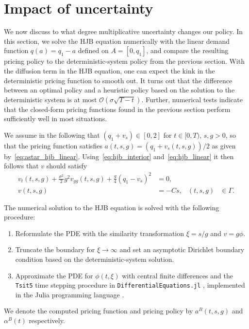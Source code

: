 \documentclass[main.tex]{subfiles}
\begin{document}
\section{Impact of uncertainty}\label{sec:stochastic_hjb}
We now discuss to what degree multiplicative uncertainty changes
our policy. In this section, we solve the HJB equation numerically with the linear
demand function $q(a)=q_1-a$ defined on $A=[0,q_1]$, and compare the
resulting pricing policy to the
deterministic-system policy from the previous section.
With the diffusion term in the HJB equation, one can
expect the kink in the deterministic pricing function to smooth
out. It turns out that the difference between an optimal
policy and a heuristic policy based on the solution
to the deterministic system is at most
$\mathcal{O}(\sigma \sqrt{T-t})$. Further, numerical tests indicate that the
closed-form pricing functions found in the previous section
perform sufficiently well in most situations.

We assume in the following that $(q_1+v_s)\in[0,2]$ for
$t\in[0,T)$, $s,g>0$, so
that the pricing function satisfies $a(t,s,g) = (q_1+v_s(t,s,g))/2$ as
given by~\eqref{eq:astar_hjb_linear}.
Using~\eqref{eq:hjb_interior} and~\eqref{eq:hjb_linear} it then
follows that $v$ should satisfy
\begin{align}\label{eq:hjb_impact_uncertainty}
  v_t(t,s,g)+\frac{\sigma^2}{2} g^2v_{gg}(t,s,g)
  +\frac{g}{4}{(q_1-v_s)}^2
  &= 0, \\%
  v(t,s,g) &= -Cs,&(t,s,g)&\in \Gamma.
\end{align}

The numerical solution to the HJB equation is solved with the
following procedure:
\begin{enumerate}
\item Reformulate the PDE with the similarity
  transformation $\xi = s/g$ and $v = g\phi$.
\item Truncate the boundary
  for $\xi\to\infty$ and set an asymptotic Dirichlet boundary condition
  based on the deterministic-system solution.
\item Approximate
  the PDE for $\phi(t,\xi)$ with central finite differences and the
  \texttt{Tsit5} time stepping procedure in
  \texttt{DifferentialEquations.jl}
  \citep{rackauckas2017differentialequations}, implemented in the Julia
  programming language \citep{bezanson2017julia}.
\end{enumerate}
We denote the computed pricing function and pricing
policy by $a^B(t,s,g)$ and $\alpha^B(t)$ respectively.
\end{document}
